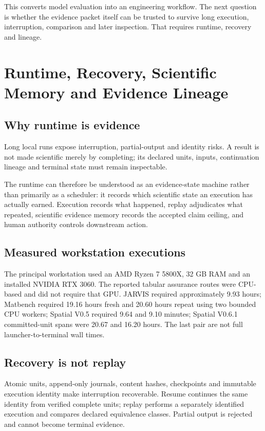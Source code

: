 \documentclass[11pt,a4paper,oneside]{report}
\begin{document}
This converts model evaluation into an engineering workflow. The next question is whether the evidence packet itself can be trusted to survive long execution, interruption, comparison and later inspection. That requires runtime, recovery and lineage.




\chapter[Runtime, Recovery and Scientific Memory]{Runtime, Recovery, Scientific Memory and Evidence Lineage}

\section{Why runtime is evidence}
Long local runs expose interruption, partial-output and identity risks. A result is not
made scientific merely by completing; its declared units, inputs, continuation lineage
and terminal state must remain inspectable.

The runtime can therefore be understood as an evidence-state machine rather than
primarily as a scheduler: it records which scientific state an execution has actually
earned. Execution records what happened, replay adjudicates what repeated, scientific
evidence memory records the accepted claim ceiling, and human authority controls
downstream action.

\section{Measured workstation executions}
The principal workstation used an AMD Ryzen 7 5800X, 32 GB RAM and an installed
NVIDIA RTX 3060. The reported tabular assurance routes were CPU-based and did not
require that GPU. JARVIS required approximately 9.93 hours; Matbench required 19.16
hours fresh and 20.60 hours repeat using two bounded CPU workers; Spatial V0.5 required
9.64 and 9.10 minutes; Spatial V0.6.1 committed-unit spans were 20.67 and 16.20 hours.
The last pair are not full launcher-to-terminal wall times.

\section{Recovery is not replay}
Atomic units, append-only journals, content hashes, checkpoints and immutable execution
identity make interruption recoverable. Resume continues the same identity from
verified complete units; replay performs a separately identified execution and compares
declared equivalence classes. Partial output is rejected and cannot become terminal
evidence.
\end{document}

